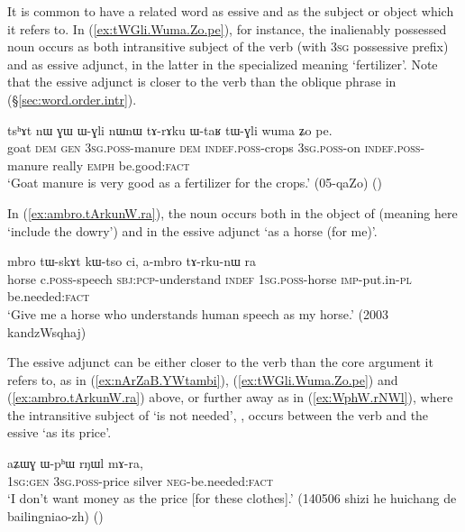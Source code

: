 
 
It is common to have a related word as essive and as the subject or object which it refers to. In (\ref{ex:tWGli.Wuma.Zo.pe}), for instance, the inalienably possessed noun  occurs as both intransitive subject of the verb  (with \textsc{3sg} possessive prefix) and as essive adjunct, in the latter in the specialized meaning `fertilizer'. Note that the essive adjunct is closer to the verb than the oblique phrase in  (§\ref{sec:word.order.intr}).

\begin{exe}
\ex \label{ex:tWGli.Wuma.Zo.pe}
\gll tsʰɤt nɯ ɣɯ ɯ-ɣli nɯnɯ tɤ-rɤku ɯ-taʁ tɯ-ɣli wuma ʑo pe. \\
goat \textsc{dem} \textsc{gen} \textsc{3sg}.\textsc{poss}-manure \textsc{dem} \textsc{indef}.\textsc{poss}-crops \textsc{3sg}.\textsc{poss}-on \textsc{indef}.\textsc{poss}-manure really \textsc{emph} be.good:\textsc{fact} \\
\glt `Goat manure is very good as a fertilizer for the crops.' (05-qaZo) 	()
\end{exe}

 In (\ref{ex:ambro.tArkunW.ra}), the noun  occurs both in the object of  (meaning here `include the dowry') and in the essive adjunct   `as a horse (for me)'.

\begin{exe}
\ex \label{ex:ambro.tArkunW.ra}
\gll mbro tɯ-skɤt kɯ-tso ci, a-mbro tɤ-rku-nɯ ra \\
horse c.\textsc{poss}-speech \textsc{sbj}:\textsc{pcp}-understand \textsc{indef} \textsc{1sg}.\textsc{poss}-horse \textsc{imp}-put.in-\textsc{pl} be.needed:\textsc{fact} \\
\glt `Give me a horse who understands human speech as my horse.'  (2003 kandzWsqhaj)
\end{exe}

The essive adjunct can be either closer to the verb than the core argument it refers to, as in (\ref{ex:nArZaB.YWtambi}), (\ref{ex:tWGli.Wuma.Zo.pe}) and (\ref{ex:ambro.tArkunW.ra}) above, or further away as in (\ref{ex:WphW.rNWl}), where the intransitive  subject of  `is not needed', , occurs between the verb and the essive  `as its price'.

\begin{exe}
\ex \label{ex:WphW.rNWl}
\gll  aʑɯɣ ɯ-pʰɯ rŋɯl mɤ-ra, \\
\textsc{1sg}:\textsc{gen} \textsc{3sg}.\textsc{poss}-price silver \textsc{neg}-be.needed:\textsc{fact} \\
\glt `I don't want money as the price [for these clothes].' (140506 shizi he huichang de bailingniao-zh) ()
\end{exe}

